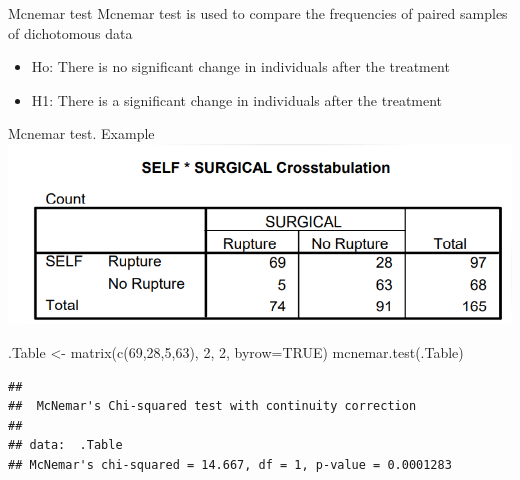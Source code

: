 \documentclass[
  ignorenonframetext,
]{beamer}
\newenvironment{Shaded}{\begin{snugshade}}{\end{snugshade}}
\newcommand{\AttributeTok}[1]{\textcolor[rgb]{0.77,0.63,0.00}{#1}}
\newcommand{\ConstantTok}[1]{\textcolor[rgb]{0.00,0.00,0.00}{#1}}
\newcommand{\DecValTok}[1]{\textcolor[rgb]{0.00,0.00,0.81}{#1}}
\newcommand{\FunctionTok}[1]{\textcolor[rgb]{0.00,0.00,0.00}{#1}}
\newcommand{\NormalTok}[1]{#1}
\newcommand{\OtherTok}[1]{\textcolor[rgb]{0.56,0.35,0.01}{#1}}
\begin{document}
\begin{frame}{Mcnemar test}
\protect\hypertarget{mcnemar-test}{}
Mcnemar test is used to compare the frequencies of paired samples of
dichotomous data

\begin{itemize}
\item
  Ho: There is no significant change in individuals after the treatment
\item
  H1: There is a significant change in individuals after the treatment
\end{itemize}
\end{frame}

\begin{frame}[fragile]{Mcnemar test. Example}
\protect\hypertarget{mcnemar-test.-example}{}
\includegraphics{images/mcnemar.PNG}

\begin{Shaded}
\begin{Highlighting}[]
\NormalTok{.Table }\OtherTok{\textless{}{-}} \FunctionTok{matrix}\NormalTok{(}\FunctionTok{c}\NormalTok{(}\DecValTok{69}\NormalTok{,}\DecValTok{28}\NormalTok{,}\DecValTok{5}\NormalTok{,}\DecValTok{63}\NormalTok{), }\DecValTok{2}\NormalTok{, }\DecValTok{2}\NormalTok{, }\AttributeTok{byrow=}\ConstantTok{TRUE}\NormalTok{)}
\FunctionTok{mcnemar.test}\NormalTok{(.Table)}
\end{Highlighting}
\end{Shaded}

\begin{verbatim}
## 
##  McNemar's Chi-squared test with continuity correction
## 
## data:  .Table
## McNemar's chi-squared = 14.667, df = 1, p-value = 0.0001283
\end{verbatim}
\end{frame}
\end{document}
